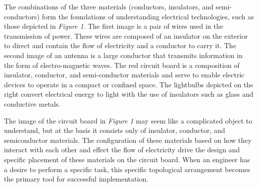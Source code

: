 \documentclass[12pt]{article}
\begin{document}
The combinations of the three materials (conductors, insulators, and semi-conductors) form the foundations of understanding electrical technologies, such as those depicted in \textit{Figure 1}. The first image is a pair of wires used in the transmission of power. These wires are composed of an insulator on the exterior to direct and contain the flow of electricity and a conductor to carry it. The second image of an antenna is a large conductor that transmits information in the form of electro-magnetic waves. The red circuit board is a composition of insulator, conductor, and semi-conductor materials and serve to enable electric devices to operate in a compact or confined space. The lightbulbs depicted on the right convert electrical energy to light with the use of insulators such as glass and conductive metals.

The image of the circuit board in \textit{Figure 1} may seem like a complicated object to understand, but at the basis it consists only of insulator, conductor, and semiconductor materials. The configuration of these materials based on how they interact with each other and effect the flow of electricity drive the design and specific placement of these materials on the circuit board. When an engineer has a desire to perform a specific task, this specific topological arrangement becomes the primary tool for successful implementation. 
\end{document}
